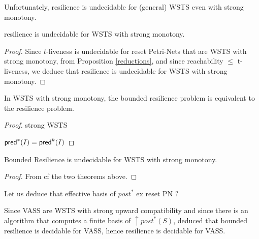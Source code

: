 %
%
%


Unfortunately, resilience is undecidable for (general) WSTS even with strong monotony.

\begin{theorem}
{\sc resilience} is undecidable for WSTS with strong monotony.
\end{theorem}


\begin{proof} 

Since $t$-liveness is undecidable for reset Petri-Nets that are WSTS with strong monotony, from Proposition \ref{reductions}, and since reachability $\leq$ t-liveness,  we deduce that resilience is undecidable for WSTS with strong monotony.
  
\end{proof}

\begin{theorem}
In WSTS with strong monotony, 
the {\sc bounded resilience} problem
is equivalent to the
{\sc resilience} problem.
\end{theorem}

\begin{proof}
strong WSTS

$\textsf{pred}^*(I) = \textsf{pred}^{k}(I)$

\end{proof}

\begin{corollary}
Bounded Resilience is undecidable for WSTS with strong monotony.
\end{corollary}

\begin{proof} 
  From
  cf
the two  theorems above. 
\end{proof}



Let us deduce that effective basis of $post^*$ ex reset PN ?

Since VASS are WSTS with strong upward compatibility and since there is an algorithm that computes a finite basis of  $\uparrow post^*(S)$, \cite{DBLP:conf/gg/Ozkan22} deduced that bounded resilience is decidable for VASS, hence resilience is decidable for VASS. 

